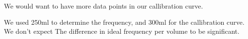 We would want to have more data points in our callibration curve.

We used 250ml to determine the frequency, and 300ml for the callibration curve. We don't expect The difference in ideal frequency per volume to be significant.